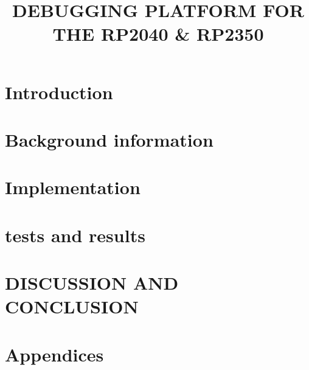 \documentclass[english, online, cse, bachelor]{dithesis}
\title{DEBUGGING
PLATFORM FOR THE RP2040 \& RP2350}
\begin{document}
\pagestyle{empty}
\maketitlepage
\makecopyrightpage

 {
  
  
}

\contents %


    
\mainmatter

\chapter{Introduction} %
  \label{introduction} %
    
\chapter{Background information}
  \label{relatedwork}
  
    
\chapter{Implementation}
  \label{implementation}
  

\chapter{tests and results}
  \label{experiments}
  

\chapter{DISCUSSION AND CONCLUSION}
  \label{conclusion}
  
   
%  

\printbibliography[heading=bibnumbered, title=\mybibname]

\startappendix
\chapter{Appendices}
  
\end{document}
